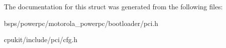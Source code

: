 The documentation for this struct was generated from the following files\+:\begin{DoxyCompactItemize}
\item 
bsps/powerpc/motorola\+\_\+powerpc/bootloader/pci.\+h\item 
cpukit/include/pci/cfg.\+h\end{DoxyCompactItemize}

